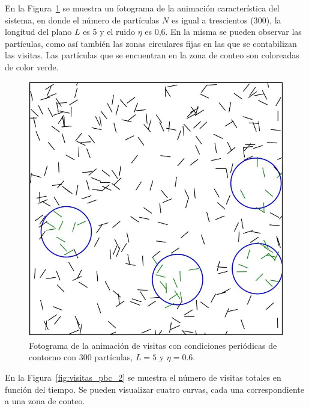 \documentclass[11pt, a4paper]{article}
\begin{document}
            En la Figura~\ref{fig:visitas_pbc_1} se muestra un fotograma de la animación característica del sistema, en donde
            el número de partículas $N$ es igual a trescientos (300), la longitud del plano $L$ es 5 y el ruido $\eta$ es 0,6.
            En la misma se pueden observar las partículas, como así también las zonas circulares fijas en las que se contabilizan las visitas.
            Las partículas que se encuentran en la zona de conteo son coloreadas de color verde.

            \begin{figure}[H]
                \centering
                \includegraphics[width=\textwidth]{./animation_visits_pbc-n300-eta0p6-frame}
                \caption{Fotograma de la animación de visitas con condiciones periódicas de contorno con $300$ partículas, $L = 5$ y $\eta = 0.6$.}
                \label{fig:visitas_pbc_1}
            \end{figure}

            En la Figura~\ref{fig:visitas_pbc_2} se muestra el número de visitas totales en función del tiempo.
            Se pueden visualizar cuatro curvas, cada una correspondiente a una zona de conteo.
\end{document}
